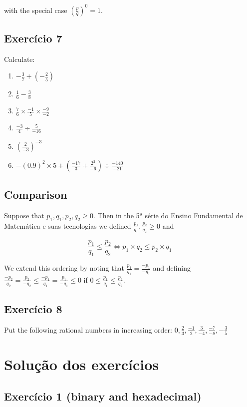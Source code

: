 with the special case $\left(\frac{p}{q}\right)^{0} = 1$.

\subsection*{Exercício 7}

Calculate:

\begin{enumerate}
\item $-\frac{3}{7} + \left(-\frac{2}{5}\right)$
\item $\frac{1}{6} - \frac{3}{8}$
\item $\frac{7}{6} \times \frac{-1}{5} \times \frac{-9}{-2}$
\item $\frac{-3}{4} \div \frac{5}{-16}$
\item $\left(\frac{2}{-3}\right)^{-3}$
\item $-{(0.9)}^2 \times 5 +
  \left( \frac{-17}{3} + \frac{2^2}{-6} \right) \div \frac{-140}{-21}$
\end{enumerate}

\subsection*{Comparison}

Suppose that $p_1,q_1,p_2,q_2 \geq 0$. Then
in the 5ª série do Ensino Fundamental de Matemática e suas tecnologias
we defined $\frac{p_1}{q_1}, \frac{p_2}{q_2} \geq 0$ and

$$\frac{p_1}{q_1} \leq \frac{p_2}{q_2} \Leftrightarrow
p_1 \times q_2 \leq p_2 \times q_1$$

We extend this ordering by noting that
$\frac{p_1}{q_1} = \frac{-p_1}{-q_1}$ and defining
$\frac{-p_2}{q_2} = \frac{p_2}{-q_2} \leq
\frac{-p_1}{q_1} = \frac{p_1}{-q_1} \leq 0 $
if $0 \leq \frac{p_1}{q_1} \leq \frac{p_2}{q_2}$.

\subsection*{Exercício 8}

Put the following rational numbers in increasing order:
$0, \frac{2}{3}, \frac{-1}{2}, \frac{3}{-4}, \frac{-7}{-8}, -\frac{3}{5}$

\section{Solução dos exercícios}

\subsection*{Exercício 1 (binary and hexadecimal)}

